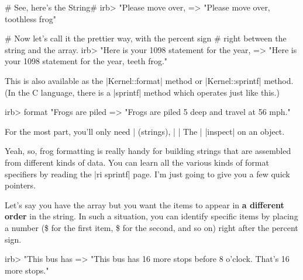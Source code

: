 \documentclass[12pt,twoside]{report}
\newcommand*{\plaininline}{\fontfamily{fvm}\small\selectfont}
\begin{document}
\begin{consolecode}

 # See, here's the String#%
 irb> "Please move over, %
   => "Please move over, toothless frog"

 # Now let's call it the prettier way, with the percent sign
 # right between the string and the array.
 irb> "Here is your 1098 statement for the year, %
   => "Here is your 1098 statement for the year, teeth frog."

\end{consolecode}


This is also available as the
\rubyinline|Kernel::format| method or
\rubyinline|Kernel::sprintf| method.  (In the C
language, there is a \rubyinline|sprintf| method which
operates just like this.)


\begin{consolecode}

 irb> format "Frogs are piled %
   => "Frogs are piled 5 deep and travel at 56 mph."

\end{consolecode}


For the most part, you'll only need \rubyinline|%
(strings), \rubyinline|%
\rubyinline|%
The \rubyinline|%
\rubyinline|inspect| on an object.

Yeah, so, frog formatting is really handy for building strings that
are assembled from different kinds of data.  You can learn all the
various kinds of format specifiers by reading the
\rubyinline|ri sprintf| page.  I'm just going to give
you a few quick pointers.

Let's say you have the array but you want the items to appear in {\bf
  a different order} in the string.  In such a situation, you can
identify specific items by placing a number
({\plaininline 1\$} for the first item,
{\plaininline 2\$} for the second, and so on) right after
the percent sign.


\begin{consolecode}

 irb> "This bus has %
   => "This bus has 16 more stops before 8 o'clock.  That's 16 more stops."

\end{consolecode}
\end{document}

